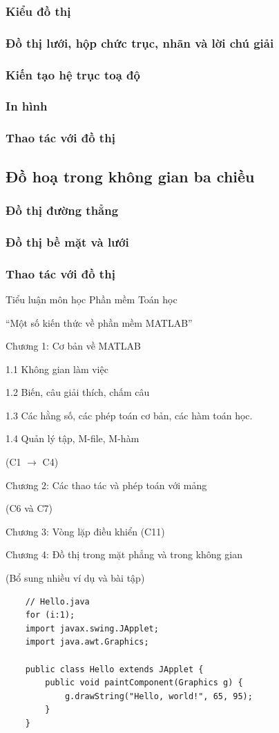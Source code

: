 \documentclass[12pt,a4paper]{article}
\begin{document}
\subsubsection{Kiểu đồ thị}
\subsubsection{Đồ thị lưới, hộp chức trục, nhãn và lời chú giải}
\subsubsection{Kiến tạo hệ trục toạ độ}
\subsubsection{In hình}
\subsubsection{Thao tác với đồ thị}
\subsection{Đồ hoạ trong không gian ba chiều}
\subsubsection{Đồ thị đường thẳng}
\subsubsection{Đồ thị bề mặt và lưới}
\subsubsection{Thao tác với đồ thị}

	
	
	Tiểu luận môn học Phần mềm Toán học

“Một số kiến thức về phần mềm MATLAB”

Chương 1: Cơ bản về MATLAB

1.1  Không gian làm việc

1.2  Biến, câu giải thích, chấm câu

1.3  Các hằng số, các phép toán cơ bản, các hàm toán học.

1.4  Quản lý tập, M-file, M-hàm

(C1 $\rightarrow$ C4)

Chương 2: Các thao tác và phép toán với mảng

(C6 và C7)

Chương 3: Vòng lặp điều khiển (C11)

Chương 4: Đồ thị trong mặt phẳng và trong không gian

(Bổ sung nhiều ví dụ và bài tập)
	\begin{lstlisting}
	// Hello.java
	for (i:1);
	import javax.swing.JApplet;
	import java.awt.Graphics;

	public class Hello extends JApplet {
    	public void paintComponent(Graphics g) {
        	g.drawString("Hello, world!", 65, 95);
    	}    
	}
	\end{lstlisting}
	
\end{document}
